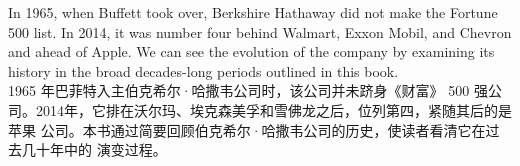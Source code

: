\begin{verseparallel}
  {
    In 1965, when Buffett took over, Berkshire Hathaway did not make the Fortune
    500 list. In 2014, it
    was number four behind Walmart, Exxon Mobil, and Chevron and ahead of
    Apple.
    We can see the evolution of the company by examining its history in
    the broad decades-long periods outlined in this
    book. \\
  }
  {
    1965 年巴菲特入主伯克希尔·哈撒韦公司时，该公司并未跻身《财富》 500 强公
    司。2014年，它排在沃尔玛、埃克森美孚和雪佛龙之后，位列第四，紧随其后的是苹果
    公司。本书通过简要回顾伯克希尔·哈撒韦公司的历史，使读者看清它在过去几十年中的
    演变过程。
  }
\end{verseparallel}

